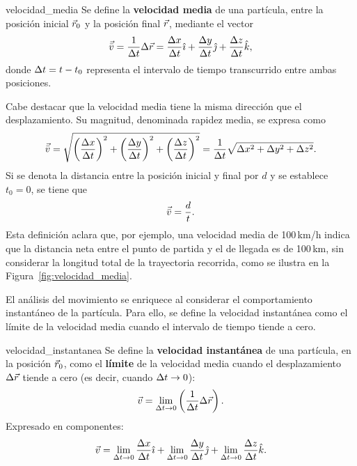 \begin{definition}{}{velocidad_media}
    Se define la \textbf{velocidad media} de una partícula, entre la posición inicial $\vec{r}_0$ y la posición final $\vec{r}$, mediante el vector
    $$\vec{\bar{v}} = \frac{1}{\Delta t}\Delta\vec{r} = \frac{\Delta x}{\Delta t}\hat{\imath} + \frac{\Delta y}{\Delta t}\hat{\jmath} + \frac{\Delta z}{\Delta t}\hat{k},$$
    donde $\Delta t = t - t_0$ representa el intervalo de tiempo transcurrido entre ambas posiciones.
\end{definition}

Cabe destacar que la velocidad media tiene la misma dirección que el desplazamiento. Su magnitud, denominada rapidez media, se expresa como
$$\vec{\bar{v}} = \sqrt{\left(\frac{\Delta x}{\Delta t}\right)^2 + \left(\frac{\Delta y}{\Delta t}\right)^2 + \left(\frac{\Delta z}{\Delta t}\right)^2} = \frac{1}{\Delta t}\sqrt{\Delta x^2 + \Delta y^2 + \Delta z^2}.$$
Si se denota la distancia entre la posición inicial y final por $d$ y se establece $t_0 = 0$, se tiene que
$$\vec{\bar{v}} = \frac{d}{t}.$$
Esta definición aclara que, por ejemplo, una velocidad media de 100\,km/h indica que la distancia neta entre el punto de partida y el de llegada es de 100\,km, sin considerar la longitud total de la trayectoria recorrida, como se ilustra en la Figura~\ref{fig:velocidad_media}.

El análisis del movimiento se enriquece al considerar el comportamiento instantáneo de la partícula. Para ello, se define la velocidad instantánea como el límite de la velocidad media cuando el intervalo de tiempo tiende a cero.

\begin{definition}{}{velocidad_instantanea}
    Se define la \textbf{velocidad instantánea} de una partícula, en la posición $\vec{r}_0$, como el \textbf{límite} de la velocidad media cuando el desplazamiento $\Delta\vec{r}$ tiende a cero (es decir, cuando $\Delta t \to 0$):
    $$\vec{v} = \lim_{\Delta t \to 0}\left(\frac{1}{\Delta t}\Delta\vec{r}\right).$$
    Expresado en componentes:
    $$\vec{v} = \lim_{\Delta t \to 0}\frac{\Delta x}{\Delta t}\hat{\imath} + \lim_{\Delta t \to 0}\frac{\Delta y}{\Delta t}\hat{\jmath} + \lim_{\Delta t \to 0}\frac{\Delta z}{\Delta t}\hat{k}.$$
\end{definition}

